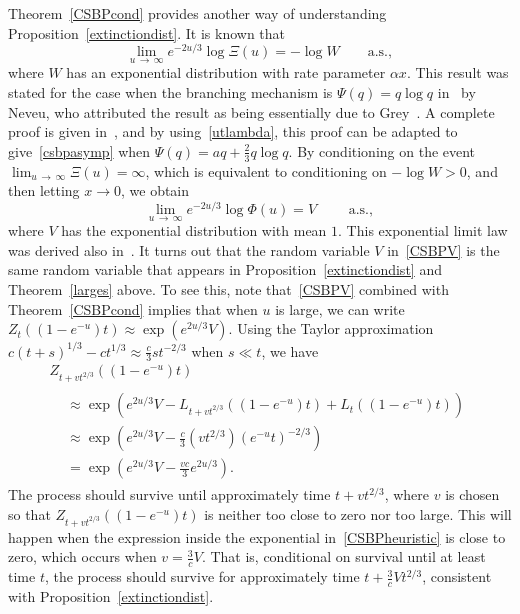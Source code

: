 \documentclass[AHL,Unicode,longabstracts,published]{cedram}
\newcommand{\1} {\mathds{1}}
\begin{document}
\begin{rema}
Theorem~\ref{CSBPcond} provides another way of understanding Proposition~\ref{extinctiondist}. It is known that
\begin{equation}\label{csbpasymp}
\lim_{u\,\rightarrow\,\infty} e^{-2u/3} \log \Xi(u) = - \log W \qquad \text{a.s.},
\end{equation}
where $W$ has an exponential distribution with rate parameter $\alpha x$. This result was stated for the case when the branching mechanism is $\Psi(q) = q \log q$ in~\cite{nev92} by Neveu, who attributed the result as being essentially due to Grey~\cite{grey77}. A complete proof is given in~\cite[Appendix~A]{fs04}, and by using~\eqref{utlambda}, this proof can be adapted to give~\eqref{csbpasymp} when $\Psi(q) = aq + \frac{2}{3} q \log q$. By conditioning on the event $\lim_{u\, \rightarrow\,\infty} \Xi(u) = \infty$, which is equivalent to conditioning on $-\log W > 0$, and then letting $x \rightarrow 0$, we obtain
\begin{equation}\label{CSBPV}
\lim_{u\,\rightarrow\,\infty} e^{-2u/3} \log \Phi(u) = V \qquad \text{ a.s.},
\end{equation}
where $V$ has the exponential distribution with mean $1$. This exponential limit law was derived also in~\cite[Proposition~7]{fm19}. It turns out that the random variable $V$ in~\eqref{CSBPV} is the same random variable that appears in Proposition~\ref{extinctiondist} and Theorem~\ref{larges} above. To see this, note that~\eqref{CSBPV} combined with Theorem~\ref{CSBPcond} implies that when $u$ is large, we can write $Z_t((1 - e^{-u})t) \approx \exp(e^{2u/3} V)$. Using the Taylor approximation $c(t + s)^{1/3} - ct^{1/3} \approx \frac{c}{3} s t^{-2/3}$ when $s \ll t$, we have
\begin{multline}\label{CSBPheuristic}
Z_{t + vt^{2/3}}\left(\left(1 - e^{-u}\right)t\right)\\
\begin{aligned}
&\approx \exp \left(e^{2u/3} V - L_{t + vt^{2/3}}\left(\left(1 - e^{-u}\right)t\right) + L_t\left(\left(1 - e^{-u}\right)t\right) \right) \\
&\approx \exp \left(e^{2u/3} V - \frac{c}{3}\left(v t^{2/3}\right) \left(e^{-u} t\right)^{-2/3} \right) \\
&= \exp\left(e^{2u/3} V - \frac{vc}{3} e^{2u/3} \right).
\end{aligned}
\end{multline}
The process should survive until approximately time $t + vt^{2/3}$, where $v$ is chosen so that $Z_{t + vt^{2/3}}((1 - e^{-u})t)$ is neither too close to zero nor too large. This will happen when the expression inside the exponential in~\eqref{CSBPheuristic} is close to zero, which occurs when $v = \frac{3}{c}V$. That is, conditional on survival until at least time $t$, the process should survive for approximately time $t + \frac{3}{c} V t^{2/3}$, consistent with Proposition~\ref{extinctiondist}.
\end{rema}
\end{document}
